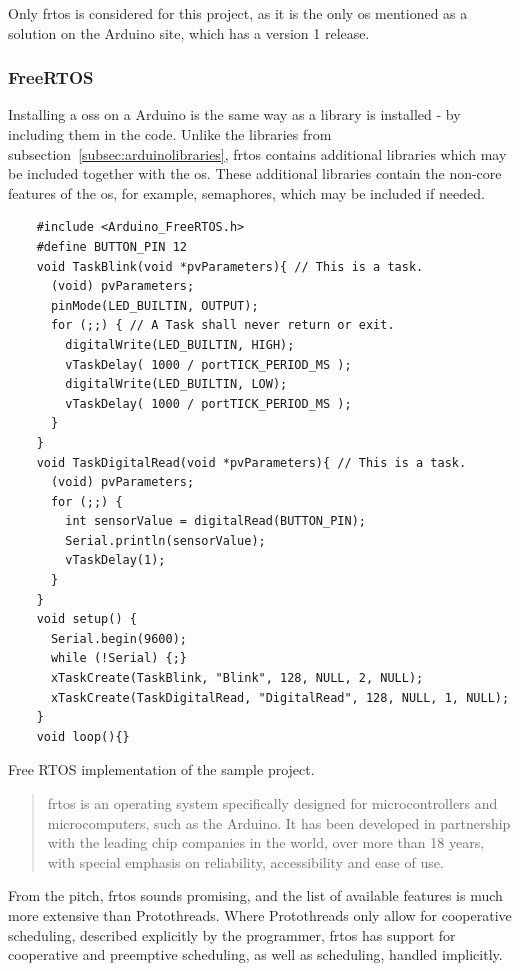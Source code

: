 Only \gls{frtos} is considered for this project, as it is the only \gls{os} mentioned as a solution on the Arduino site, which has a version 1 release.


\subsubsection{FreeRTOS}
Installing a \glspl{os} on a Arduino is the same way as a library is installed - by including them in the code. Unlike the libraries from subsection~\ref{subsec:arduinolibraries}, \gls{frtos} contains additional libraries which may be included together with the \gls{os}. These additional libraries contain the non-core features of the \gls{os}, for example, semaphores, which may be included if needed.


\begin{listing}[htb!]
  \centering
  \begin{verbatim}
    #include <Arduino_FreeRTOS.h>
    #define BUTTON_PIN 12
    void TaskBlink(void *pvParameters){ // This is a task.
      (void) pvParameters;
      pinMode(LED_BUILTIN, OUTPUT);
      for (;;) { // A Task shall never return or exit.
        digitalWrite(LED_BUILTIN, HIGH);
        vTaskDelay( 1000 / portTICK_PERIOD_MS );
        digitalWrite(LED_BUILTIN, LOW);
        vTaskDelay( 1000 / portTICK_PERIOD_MS );
      }
    }
    void TaskDigitalRead(void *pvParameters){ // This is a task.
      (void) pvParameters;
      for (;;) {
        int sensorValue = digitalRead(BUTTON_PIN);
        Serial.println(sensorValue);
        vTaskDelay(1);
      }
    }
    void setup() {
      Serial.begin(9600);
      while (!Serial) {;}
      xTaskCreate(TaskBlink, "Blink", 128, NULL, 2, NULL);
      xTaskCreate(TaskDigitalRead, "DigitalRead", 128, NULL, 1, NULL);
    }
    void loop(){}
\end{verbatim}
  \caption{Free RTOS implementation of the sample project.}
  \label{lst:freeftosexample}
\end{listing}


\blockcquote{AboutRTOS}{\gls{frtos} is an operating system specifically designed for microcontrollers and microcomputers, such as the Arduino. It has been developed in partnership with the leading chip companies in the world, over more than 18 years, with special emphasis on reliability, accessibility and ease of use.}

From the pitch, \gls{frtos} sounds promising, and the list of available features is much more extensive than Protothreads. Where Protothreads only allow for cooperative scheduling, described explicitly by the programmer, \gls{frtos} has support for cooperative and preemptive scheduling, as well as scheduling, handled implicitly.

